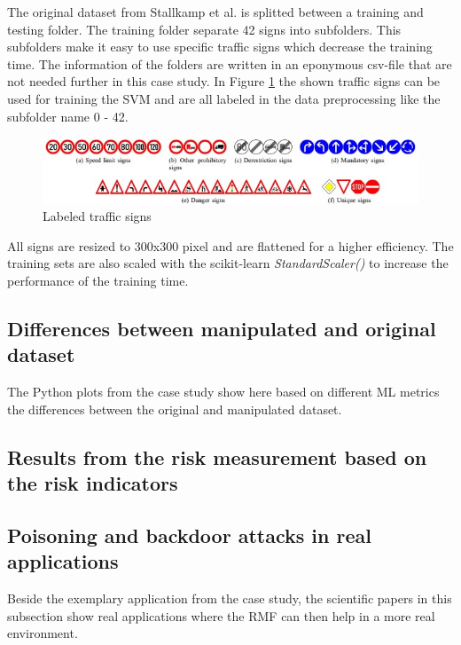 The original dataset from Stallkamp et al. is splitted between a training and testing folder. The training folder separate 42 signs into subfolders. This subfolders make it easy to use specific traffic signs which decrease the training time. The information of the folders are written in an eponymous csv-file that are not needed further in this case study. In Figure \ref{fig:traffic_signs} the shown traffic signs can be used for training the SVM and are all labeled in the data preprocessing like the subfolder name 0 - 42.

\begin{figure}[h!]
  \centering
  \includegraphics[width=12cm]{pictures/traffic_signs.jpg}
  \caption{Labeled traffic signs \cite{DBLP:conf/ijcnn/StallkampSSI11}}
  \label{fig:traffic_signs}
\end{figure}

All signs are resized to 300x300 pixel and are flattened for a higher efficiency. The training sets are also scaled with the scikit-learn \textit{StandardScaler()} to increase the performance of the training time.

\subsection{Differences between manipulated and original dataset}

The Python plots from the case study show here based on different ML metrics the differences between the original and manipulated dataset.

\subsection{Results from the risk measurement based on the risk indicators}

\subsection{Poisoning and backdoor attacks in real applications}

Beside the exemplary application from the case study, the scientific papers in this subsection show real applications where the RMF can then help in a more real environment.
